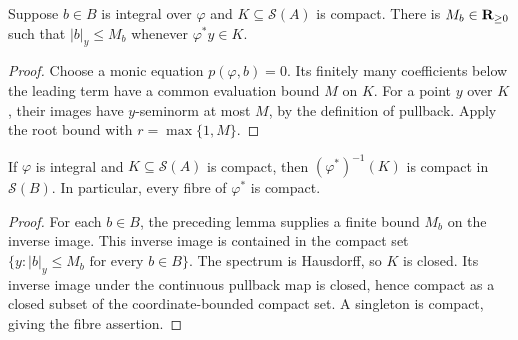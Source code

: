 \begin{lemma}\label{spectrum:integral-element-compact-bound}
\leanok
{}
Suppose $b\in B$ is integral over $\varphi$ and $K\subseteq\mathcal S(A)$ is
compact. There is $M_b\in\mathbf{R}_{\ge0}$ such that $|b|_y\le M_b$ whenever
$\varphi^*y\in K$.
\end{lemma}
\begin{proof}
Choose a monic equation $p(\varphi,b)=0$. Its finitely many coefficients
below the leading term have a common evaluation bound $M$ on $K$.
For a point $y$ over $K$, their images have $y$-seminorm at most $M$,
by the definition of pullback. Apply the root bound with $r=\max\{1,M\}$.
\end{proof}

\begin{theorem}\label{spectrum:integral-compact-preimage}
\leanok
{}
If $\varphi$ is integral and $K\subseteq\mathcal S(A)$ is compact, then
$(\varphi^*)^{-1}(K)$ is compact in $\mathcal S(B)$. In particular, every
fibre of $\varphi^*$ is compact.
\end{theorem}
\begin{proof}
For each $b\in B$, the preceding lemma supplies a finite bound $M_b$ on
the inverse image. This inverse image is contained in the compact set
$\{y:|b|_y\le M_b\text{ for every }b\in B\}$.
The spectrum is Hausdorff, so $K$ is closed. Its inverse image under the
continuous pullback map is closed, hence compact as a closed subset of the
coordinate-bounded compact set. A singleton is compact, giving the fibre assertion.
\end{proof}

